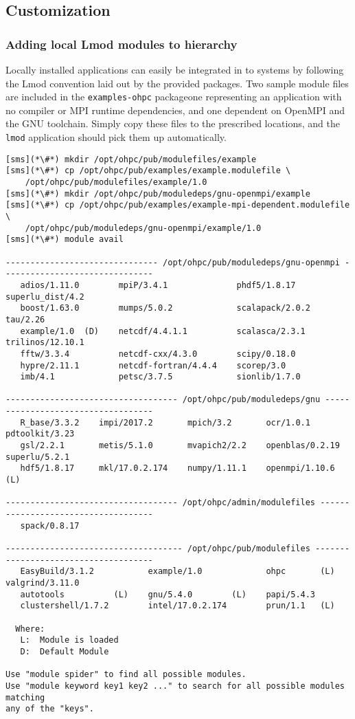 \subsection{Customization} \label{appendix:customization}

\subsubsection{Adding local Lmod modules to \OHPC{} hierarchy} \label{appendix:modulefiles}
Locally installed applications can easily be integrated in to \OHPC{} systems by
following the Lmod convention laid out by the provided packages. Two sample
module files are included in the \texttt{examples-ohpc} package\textemdash one
representing an application with no compiler or MPI runtime dependencies, and
one dependent on OpenMPI and the GNU toolchain. Simply copy these files to the
prescribed locations, and the \texttt{lmod} application should pick them up
automatically.

\begin{lstlisting}
[sms](*\#*) mkdir /opt/ohpc/pub/modulefiles/example
[sms](*\#*) cp /opt/ohpc/pub/examples/example.modulefile \
    /opt/ohpc/pub/modulefiles/example/1.0
[sms](*\#*) mkdir /opt/ohpc/pub/moduledeps/gnu-openmpi/example
[sms](*\#*) cp /opt/ohpc/pub/examples/example-mpi-dependent.modulefile \
    /opt/ohpc/pub/moduledeps/gnu-openmpi/example/1.0
[sms](*\#*) module avail

------------------------------- /opt/ohpc/pub/moduledeps/gnu-openmpi -------------------------------
   adios/1.11.0        mpiP/3.4.1              phdf5/1.8.17 superlu_dist/4.2
   boost/1.63.0        mumps/5.0.2             scalapack/2.0.2    tau/2.26
   example/1.0  (D)    netcdf/4.4.1.1          scalasca/2.3.1 trilinos/12.10.1
   fftw/3.3.4          netcdf-cxx/4.3.0        scipy/0.18.0
   hypre/2.11.1        netcdf-fortran/4.4.4    scorep/3.0
   imb/4.1             petsc/3.7.5             sionlib/1.7.0

----------------------------------- /opt/ohpc/pub/moduledeps/gnu -----------------------------------
   R_base/3.3.2    impi/2017.2       mpich/3.2       ocr/1.0.1 pdtoolkit/3.23
   gsl/2.2.1       metis/5.1.0       mvapich2/2.2    openblas/0.2.19 superlu/5.2.1
   hdf5/1.8.17     mkl/17.0.2.174    numpy/1.11.1    openmpi/1.10.6  (L)

----------------------------------- /opt/ohpc/admin/modulefiles ------------------------------------
   spack/0.8.17

------------------------------------ /opt/ohpc/pub/modulefiles -------------------------------------
   EasyBuild/3.1.2           example/1.0             ohpc       (L) valgrind/3.11.0
   autotools          (L)    gnu/5.4.0        (L)    papi/5.4.3
   clustershell/1.7.2        intel/17.0.2.174        prun/1.1   (L)

  Where:
   L:  Module is loaded
   D:  Default Module

Use "module spider" to find all possible modules.
Use "module keyword key1 key2 ..." to search for all possible modules matching
any of the "keys".
\end{lstlisting}


